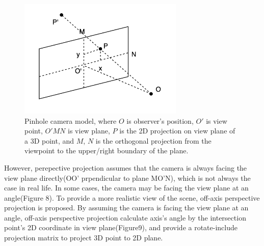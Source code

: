 \begin{figure}[htb]
    \centering
    \includegraphics[width=0.7\textwidth]{figures/Preliminaries/pinCamera.png}
    \caption{Pinhole camera model, where $O$ is observer's position, $O'$ is view point, $O'MN $ is view plane, $P$ is the 2D projection on view plane of a 3D point, and $M$, $N$ is the orthogonal projection from the viewpoint to the upper/right boundary of the plane.}\label{F:test-a}
\end{figure}


However, perepective projection assumes that the camera is always facing the view plane directly(OO' prpendicular to plane MO'N), which is not always the case in real life. In some cases, the camera may be facing the view plane at an angle(Figure 8). To provide a more realistic view of the scene, off-axis perspective projection is proposed\cite{off-axis}\cite{Kooima2011GeneralizedPP}. By assuming the camera is facing the view plane at an angle, off-axis perspective projection calculate axis's angle by the intersection point's 2D coordinate in view plane(Figure9), and provide a rotate-include projection matrix to project 3D point to 2D plane. 


